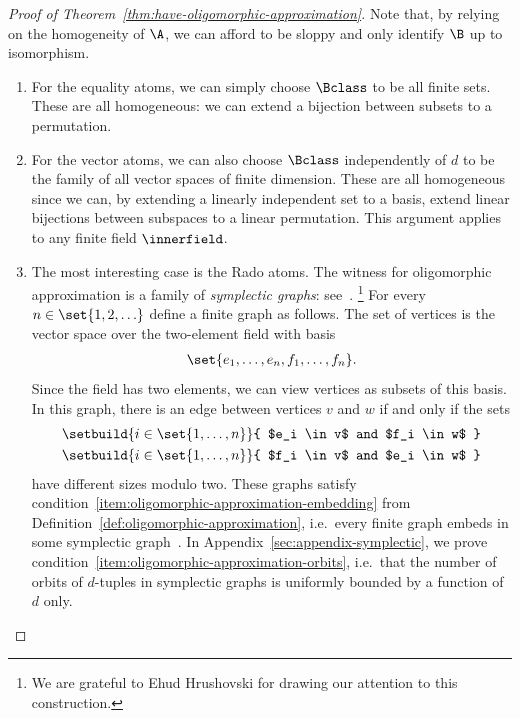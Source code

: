 \begin{proof}[Proof of Theorem~\ref{thm:have-oligomorphic-approximation}]
    \color{magenta}
    Note that, by relying on the homogeneity of $\A$, we can afford to be sloppy and only identify $\B$ up to isomorphism. 
    \color{black}

    \begin{enumerate}
        \item For the equality atoms, we can simply choose $\Bclass$ to be all finite sets. 
        These are all homogeneous: we can extend a bijection between subsets to a permutation.
        \item For the vector atoms, we can also choose $\Bclass$ independently of $d$ to be the family of all vector spaces of finite dimension. 
        These are all homogeneous since we can, by extending a linearly independent set to a basis, extend linear bijections between subspaces to a linear permutation. 
        This argument applies to any finite field $\innerfield$.
        \item 
        The most interesting case is the Rado atoms. 
        The witness for oligomorphic approximation%
        is a family of \emph{symplectic graphs}: see~\cite[Sec.~8.11]{GR01}.%
        \footnote{We are grateful to Ehud Hrushovski for drawing our attention to this construction.} 
        For every $n \in \set{1,2,\ldots}$ define a finite graph as follows. 
        The set of vertices is the vector space over the two-element field with basis 
        \begin{align*}
            \set{e_1,\ldots,e_n, f_1,\ldots,f_n}.
        \end{align*}
        Since the field has two elements, we can view vertices as subsets of this basis. In this graph, there is an edge between vertices $v$ and $w$ if and only if the sets 
        \begin{align*}
            \setbuild{ i \in \set{1,\ldots,n}}{ $e_i \in v$ and $f_i \in w$ }\\
            \setbuild{ i \in \set{1,\ldots,n}}{ $f_i \in v$ and $e_i \in w$ }
        \end{align*}
        have different sizes modulo two. 
        These graphs satisfy condition~\eqref{item:oligomorphic-approximation-embedding} from Definition~\ref{def:oligomorphic-approximation}, i.e.~every finite graph embeds in some symplectic graph~\cite[Thm.~8.11.2]{GR01}. 
        In Appendix~\ref{sec:appendix-symplectic}, we prove condition~\eqref{item:oligomorphic-approximation-orbits}, i.e.~that the number of orbits of $d$-tuples in symplectic graphs is uniformly bounded by a function of $d$ only. \qedhere
    \end{enumerate}
\end{proof}

